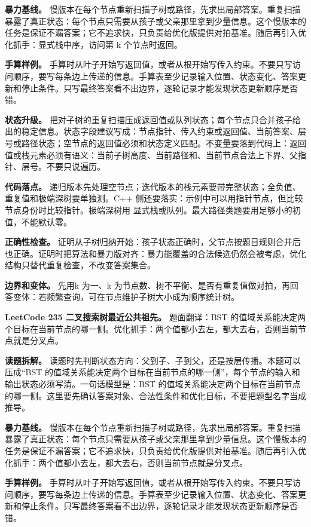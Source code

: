 \textbf{暴力基线。} 慢版本在每个节点重新扫描子树或路径，先求出局部答案。重复扫描暴露了真正状态：每个节点只需要从孩子或父亲那里拿到少量信息。这个慢版本的任务是保证不漏答案；它不追求快，只负责给优化版提供对拍基准。随后再引入优化抓手：显式栈中序，访问第 k 个节点时返回。

\textbf{手算样例。} 手算时从叶子开始写返回值，或者从根开始写传入约束。不要只写访问顺序，要写每条边上传递的信息。手算表至少记录输入位置、状态变化、答案更新和停止条件。只写最终答案看不出边界，逐轮记录才能发现状态更新顺序是否错。

\textbf{状态升级。} 把对子树的重复扫描压成返回值或队列状态；每个节点只合并孩子给出的稳定信息。状态字段建议写成：节点指针、传入约束或返回值、当前答案、层号或路径状态；空节点的返回值必须和状态定义匹配。不变量要落到代码上：返回值或栈元素必须有语义：当前子树高度、当前路径和、当前节点合法上下界、父指针、层号。不要只说遍历。

\textbf{代码落点。} 递归版本先处理空节点；迭代版本的栈元素要带完整状态；全负值、重复值和极端深树要单独测。C++ 侧还要落实：示例中可以用指针节点，但比较节点身份时比较指针。极端深树用  显式栈或队列。最大路径类题要用足够小的初值，不能默认零。

\textbf{正确性检查。} 证明从子树归纳开始：孩子状态正确时，父节点按题目规则合并后也正确。证明时把算法和暴力版对齐：暴力能覆盖的合法候选仍然会被考虑，优化结构只替代重复检查，不改变答案集合。

\textbf{边界和变体。} 先用k 为一、k 为节点数、树不平衡、是否有重复值做对拍，再回答变体：若频繁查询，可在节点维护子树大小成为顺序统计树。

\noindent\textbf{LeetCode 235 二叉搜索树最近公共祖先。} 题面翻译：BST 的值域关系能决定两个目标在当前节点的哪一侧。优化抓手：两个值都小去左，都大去右，否则当前节点就是分叉点。

\textbf{读题拆解。} 读题时先判断状态方向：父到子、子到父，还是按层传播。本题可以压成“BST 的值域关系能决定两个目标在当前节点的哪一侧”，每个节点的输入和输出状态必须写清。一句话模型是：BST 的值域关系能决定两个目标在当前节点的哪一侧。这里要先确认答案对象、合法性条件和优化目标，不要把题型名字当成推导。

\textbf{暴力基线。} 慢版本在每个节点重新扫描子树或路径，先求出局部答案。重复扫描暴露了真正状态：每个节点只需要从孩子或父亲那里拿到少量信息。这个慢版本的任务是保证不漏答案；它不追求快，只负责给优化版提供对拍基准。随后再引入优化抓手：两个值都小去左，都大去右，否则当前节点就是分叉点。

\textbf{手算样例。} 手算时从叶子开始写返回值，或者从根开始写传入约束。不要只写访问顺序，要写每条边上传递的信息。手算表至少记录输入位置、状态变化、答案更新和停止条件。只写最终答案看不出边界，逐轮记录才能发现状态更新顺序是否错。

